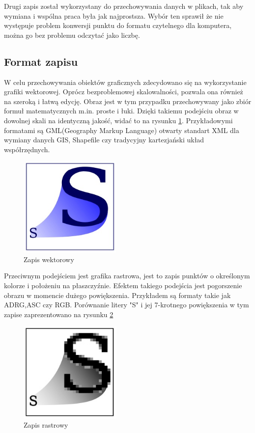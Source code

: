 Drugi zapis został wykorzystany do przechowywania danych w plikach, tak aby wymiana i wspólna praca była jak najprostsza. Wybór ten sprawił że nie występuje problem konwersji punktu do formatu czytelnego dla komputera, można go bez problemu odczytać jako liczbę.

\subsection{Format zapisu}
\label{subsec:zapisWektorowy}

W celu przechowywania obiektów graficznych zdecydowano się na wykorzystanie grafiki wektorowej. Oprócz bezproblemowej skalowalności, pozwala ona również na szeroką i łatwą edycję.
Obraz jest w tym przypadku przechowywany jako zbiór formuł matematycznych m.in. proste i łuki. Dzięki takiemu podejściu obraz w dowolnej skali na identyczną jakość, widać to na rysunku \ref{fig:wekt}. Przykładowymi formatami są GML(Geography Markup Language) otwarty standart XML dla wymiany danych GIS, Shapefile czy tradycyjny kartezjański układ współrzędnych.

  \begin{figure}[H]
  \centering
    \includegraphics[width=50mm]{ge/a1.jpg}
  \caption{Zapis wektorowy}
  \label{fig:wekt}
  \end{figure}

Przeciwnym podejściem jest grafika rastrowa, jest to zapis punktów o określonym kolorze i położeniu na płaszczyźnie.  Efektem takiego podejścia jest pogorszenie obrazu w momencie dużego powiększenia. Przykładem są formaty takie jak ADRG,ASC czy RGB.
Porównanie litery "S" i jej 7-krotnego powiększenia w tym zapise zaprezentowano na rysunku \ref{fig:rast}
  \begin{figure}[H]
  \centering
    \includegraphics[width=50mm]{ge/a2.jpg}
  \caption{Zapis rastrowy}
  \label{fig:rast}
  \end{figure}

